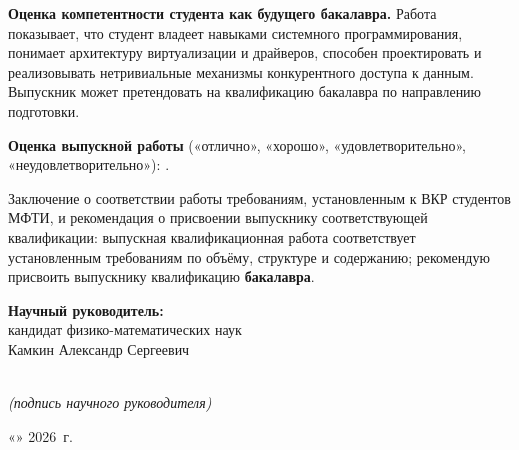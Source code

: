 \documentclass[a4paper, 14pt]{article}
\begin{document}
\textbf{Оценка компетентности студента как будущего бакалавра.}
Работа показывает, что студент владеет навыками системного программирования,
понимает архитектуру виртуализации и драйверов, способен проектировать и реализовывать
нетривиальные механизмы конкурентного доступа к данным. Выпускник может претендовать на
квалификацию бакалавра по направлению подготовки.

\vspace{1em}

\noindent\textbf{Оценка выпускной работы}
(«отлично», «хорошо», «удовлетворительно», «неудовлетворительно»): \underline{\hspace{4cm}}.

Заключение о соответствии работы требованиям, установленным к ВКР студентов МФТИ,
и рекомендация о присвоении выпускнику соответствующей квалификации: выпускная
квалификационная работа соответствует установленным требованиям по объёму, структуре
и содержанию; рекомендую присвоить выпускнику квалификацию \textbf{бакалавра}.

\vspace{2em}

\noindent\textbf{Научный руководитель:}\\
кандидат физико-математических наук\\
Камкин Александр Сергеевич

\vspace{2em}

\noindent\underline{\hspace{6cm}}\\
\noindent\textit{(подпись научного руководителя)}

\vspace{2em}

\noindent\hfill «\underline{\hspace{1cm}}» \underline{\hspace{3cm}} 2026~г.
\end{document}
